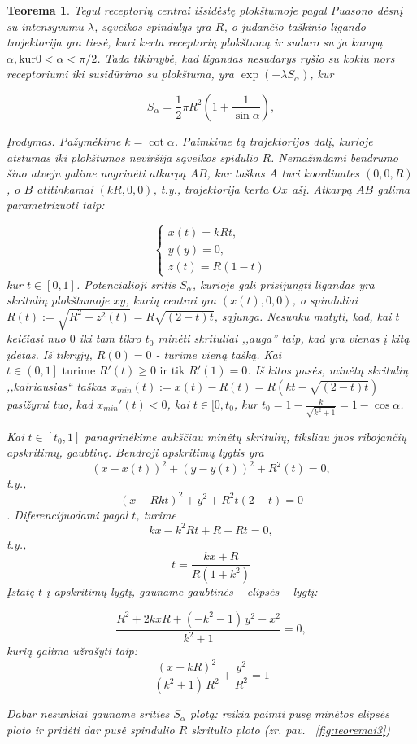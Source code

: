 \documentclass[10pt]{article}
\newtheorem{thm}{Teorema}
\begin{document}
\begin{thm}\label{thm:3}
Tegul receptorių centrai išsidėstę plokštumoje  pagal Puasono dėsnį su intensyvumu $\lambda$,  sąveikos spindulys yra $R$, o judančio taškinio ligando trajektorija yra  tiesė, kuri kerta receptorių plokštumą ir sudaro su ja kampą $\alpha, \mbox{kur} 0 < \alpha < \pi/2 $. Tada  tikimybė, kad ligandas nesudarys ryšio su kokiu nors receptoriumi  iki susidūrimo su plokštuma, yra $ \exp( -\lambda S_{\alpha}) $, kur 

\[
S_{\alpha} = \frac{1}{2} \pi R^2 \left(1 + \frac{1}{\sin \alpha } \right),
\]

Įrodymas. Pažymėkime $ k = \cot \alpha $. Paimkime tą trajektorijos dalį, kurioje atstumas iki plokštumos neviršija sąveikos spidulio  $ R $. Nemažindami bendrumo šiuo atveju galime nagrinėti atkarpą $ AB $, kur taškas $ A $ turi koordinates $ (0,0,R) $, o $ B $ atitinkamai  $ (kR,0,0) $, t.y., trajektorija kerta $ Ox $ ašį. Atkarpą  $ AB $ galima parametrizuoti taip:

\[
\begin{cases}
x(t) = kRt, \\
y(y) = 0, \\
z(t) = R(1-t)
\end{cases}
\]
kur $ t \in [0,1] $. Potencialioji sritis $ S_{\alpha} $, kurioje gali prisijungti ligandas yra skritulių plokštumoje $ xy $, kurių centrai yra $ (x(t),0,0)$, o spinduliai $ R(t):=\sqrt{R^2-z^2(t)}=R\sqrt{(2-t)t} $, sąjunga.
Nesunku matyti, kad, kai $ t $ keičiasi nuo $ 0 $ iki tam tikro $ t_0 $ minėti skrituliai ,,auga'' taip, kad yra vienas į kitą įdėtas. 
Iš tikrųjų, $ R(0)=0 $ - turime vieną tašką. Kai $ t \in \left( 0,1 \right] \mbox{ turime } R'(t) \geq 0 \mbox{ ir tik } R'(1)=0 $. Iš kitos pusės, minėtų skritulių ,,kairiausias`` taškas $ x_{min}(t) := x(t) - R(t) = R(kt-\sqrt{(2-t)t}) $ pasižymi tuo, kad $ x_{min}'(t) < 0 $, kai $ t \in [0, t_{0} $, kur 
$ t_{0} = 1 - \frac{k}{\sqrt{k^2+1}} = 1 - \cos \alpha  $.

Kai $ t \in [t_{0}, 1] $ panagrinėkime aukščiau minėtų skritulių, tiksliau juos ribojančių apskritimų, gaubtinę. Bendroji apskritimų lygtis yra
$$ (x-x(t))^2 + (y-y(t))^2 + R^2(t) = 0, $$ 
t.y.,
$$ (x-Rkt)^2 + y^2 + R^2t(2-t) = 0 $$. 
Diferencijuodami pagal $ t $, turime 
$$ kx-k^2Rt+R-Rt = 0,  $$
t.y.,
$$
	t=\frac{kx+R}{R(1+k^2)}
$$
Įstatę $ t $ į apskritimų lygtį, gauname  gaubtinės -- elipsės -- lygtį:

\[\frac{{R}^{2}+2kxR+\left( -{k}^{2}-1\right) \,{y}^{2}-{x}^{2}}{{k}^{2}+1}=0, \]
kurią galima užrašyti taip:
\[\frac{{\left( x-kR\right) }^{2}}{\left( {k}^{2}+1\right) \,{R}^{2}}+\frac{{y}^{2}}{{R}^{2}}=1\]


Dabar nesunkiai gauname srities $ S_{\alpha} $ plotą: reikia paimti pusę minėtos elipsės ploto ir pridėti dar  pusė spindulio $ R $ skritulio ploto (zr. pav. ~\ref{fig:teoremai3}) 

\end{thm}
\end{document}
